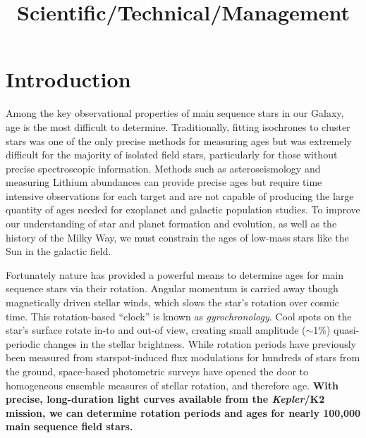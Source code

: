 \documentclass[12pt]{article}
\newcommand{\Kepler}{\textsl{Kepler}\xspace}
\begin{document}


\title{\vspace{-0.5in}Scientific/Technical/Management}
\date{}

\maketitle


\vspace{-1in}

\section{Introduction}



Among the key observational properties of main sequence stars in our Galaxy,
age is the most difficult to determine.
Traditionally, fitting isochrones to cluster stars was one of the only precise
methods for measuring ages but was extremely difficult for the majority of
isolated field stars, particularly for those without precise spectroscopic
information.
Methods such as asteroseismology and measuring Lithium abundances can provide
precise ages but require time intensive observations for each target and are
not capable of producing the large quantity of ages needed for exoplanet and
galactic population studies.
To improve our understanding of star and planet formation and evolution, as
well as the history of the Milky Way, we must constrain the ages of
low-mass stars like the Sun in the galactic field.

Fortunately nature has provided a powerful means to determine ages for main
sequence stars via their rotation.
Angular momentum is carried away though magnetically driven stellar winds,
which slows the star's rotation over cosmic time.
This rotation-based ``clock'' is known as {\it gyrochronology}.
Cool spots on the star's surface rotate in-to and out-of view, creating small
amplitude ($\sim$1\%) quasi-periodic changes in the stellar brightness.
While rotation periods have previously been %
measured from
starspot-induced flux modulations for hundreds of stars from the ground,
space-based photometric surveys have opened the door to homogeneous ensemble
measures of stellar rotation, and therefore age.
{\bf With precise, long-duration light curves available from the \Kepler/K2
mission, we can determine rotation periods and ages for nearly 100,000
main sequence field stars.}
\end{document}
